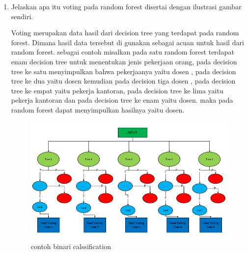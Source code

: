 \begin{enumerate}
\item Jelaskan apa itu voting pada random forest disertai dengan ilustrasi gambar sendiri.\par
Voting merupakan data hasil dari decision tree yang terdapat pada random forest. Dimana hasil data tersebut di gunakan sebagai acuan untuk hasil dari random forest. sebagai contoh misalkan pada satu random forest terdapat enam decision tree untuk menentukan jenis pekerjaan orang, pada decision tree ke satu menyimpulkan bahwa pekerjaanya yaitu dosen , pada decision tree ke dua yaitu dosen kemudian pada decision tiga dosen , pada decision tree ke empat yaitu pekerja kantoran, pada decision tree ke lima yaitu pekerja kantoran dan pada decision tree ke enam yaitu dosen. maka pada random forest dapat menyimpulkan hasilnya yaitu dosen. 
\begin{figure}[ht]
\centering
\includegraphics[scale=0.2]{figures/1174051/3/3.png}
\caption{contoh binari calssification}
\label{contoh}
\end{figure}

\end{enumerate}


